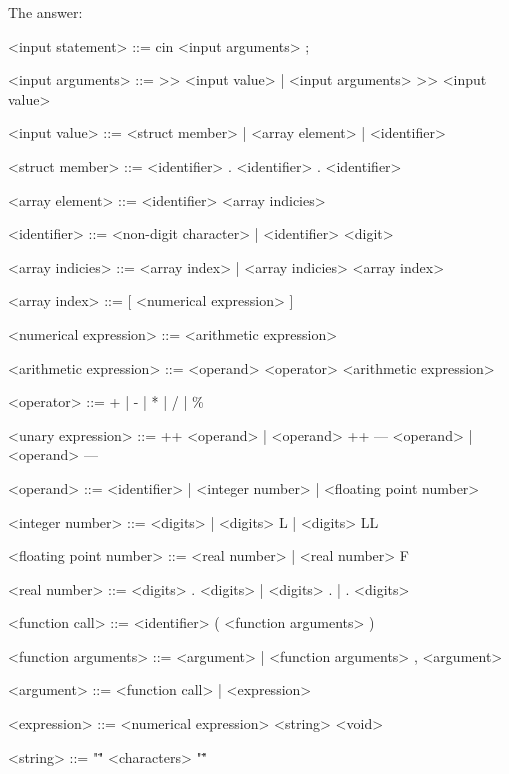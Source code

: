 \documentclass{article}
\begin{document}
		The answer:
		
	\ttfamily
	
	
	
	\begin{grammar}
	
		<input statement> ::= cin <input arguments> ;
		
		<input arguments> ::= >> <input value> | <input arguments> >> <input value>
		
		<input value> ::= <struct member> | <array element> | <identifier>
		
		<struct member> ::= <identifier> . <identifier>
					   \alt <struct member> . <identifier> 
		
		<array element> ::= <identifier> <array indicies>
		
		<identifier> ::= <non-digit character> | <identifier> <digit>
		
		<array indicies> ::= <array index> | <array indicies> <array index>
		
		<array index> ::= [ <numerical expression> ]
		
		<numerical expression> ::= <arithmetic expression>
							  \alt <unary expression>
					    	  \alt <function call>
							  					
		<arithmetic expression> ::= <operand>
							   \alt <arithmetic expression> <operator> <arithmetic expression>

		<operator> ::= + | - | * | / | \% 

		<unary expression> ::= ++ <operand> | <operand> ++ 
							 \alt --- <operand> | <operand> ---
									 
		<operand> ::= <identifier> | <integer number> | <floating point number>
		
		<integer number> ::= <digits> | <digits> L | <digits> LL
		
		<floating point number> ::= <real number> | <real number> F
		
		<real number> ::= <digits> . <digits> | <digits> . | . <digits>
				
		<function call> ::= <identifier> ( <function arguments> )
		
		<function arguments> ::= <argument> | <function arguments> , <argument>
				
		<argument> ::= <function call> | <expression>
		
		<expression> ::= <numerical expression>
					\alt <string>
					\alt <character literal>
					\alt <void>
					
		<string> ::= "\"" <characters> "\""
		

\end{grammar}
\end{document}
